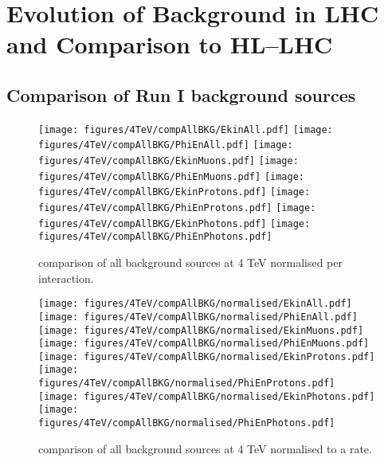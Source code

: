 \section{Evolution of Background in LHC and Comparison to HL--LHC\label{evolut}}
\subsection{Comparison of Run I background sources}
\begin{figure}
\begin{center}
  \texttt{[image: figures/4TeV/compAllBKG/EkinAll.pdf]}
  \texttt{[image: figures/4TeV/compAllBKG/PhiEnAll.pdf]}
  \texttt{[image: figures/4TeV/compAllBKG/EkinMuons.pdf]}
  \texttt{[image: figures/4TeV/compAllBKG/PhiEnMuons.pdf]}
  \texttt{[image: figures/4TeV/compAllBKG/EkinProtons.pdf]}
  \texttt{[image: figures/4TeV/compAllBKG/PhiEnProtons.pdf]}
  \texttt{[image: figures/4TeV/compAllBKG/EkinPhotons.pdf]}
  \texttt{[image: figures/4TeV/compAllBKG/PhiEnPhotons.pdf]}
\end{center}
\vspace{-0.6cm}
 \caption{comparison of all background sources at 4 TeV normalised per interaction.
  \label{compPM_raden}}
\end{figure}


\begin{figure}
\begin{center}
  \texttt{[image: figures/4TeV/compAllBKG/normalised/EkinAll.pdf]}
  \texttt{[image: figures/4TeV/compAllBKG/normalised/PhiEnAll.pdf]}
  \texttt{[image: figures/4TeV/compAllBKG/normalised/EkinMuons.pdf]}
  \texttt{[image: figures/4TeV/compAllBKG/normalised/PhiEnMuons.pdf]}
  \texttt{[image: figures/4TeV/compAllBKG/normalised/EkinProtons.pdf]}
  \texttt{[image: figures/4TeV/compAllBKG/normalised/PhiEnProtons.pdf]}
  \texttt{[image: figures/4TeV/compAllBKG/normalised/EkinPhotons.pdf]}
  \texttt{[image: figures/4TeV/compAllBKG/normalised/PhiEnPhotons.pdf]}
\end{center}
\vspace{-0.6cm}
 \caption{comparison of all background sources at 4 TeV normalised to a rate.
  \label{compPM_raden_norm}}
\end{figure}

